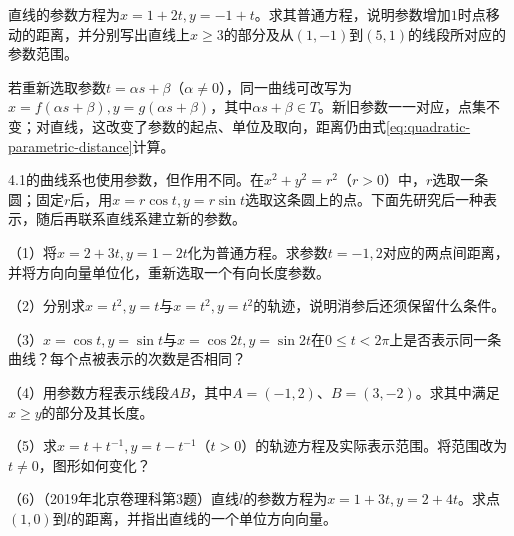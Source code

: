 \par\noindent\begin{minipage}{\linewidth}
\begin{example}
直线的参数方程为\(x=1+2t,y=-1+t\)。求其普通方程，说明参数增加\(1\)时点移动的距离，并分别写出直线上\(x\ge3\)的部分及从\((1,-1)\)到\((5,1)\)的线段所对应的参数范围。
\end{example}
\end{minipage}\par


若重新选取参数\(t=\alpha s+\beta\)（\(\alpha\ne0\)），同一曲线可改写为\(x=f(\alpha s+\beta),y=g(\alpha s+\beta)\)，其中\(\alpha s+\beta\in T\)。新旧参数一一对应，点集不变；对直线，这改变了参数的起点、单位及取向，距离仍由式\eqref{eq:quadratic-parametric-distance}计算。

4.1的曲线系也使用参数，但作用不同。在\(x^2+y^2=r^2\)（\(r>0\)）中，\(r\)选取一条圆；固定\(r\)后，用\(x=r\cos t,y=r\sin t\)选取这条圆上的点。下面先研究后一种表示，随后再联系直线系建立新的参数。

\begin{exercise}
\mbox{}\par\nobreak

\begin{samepage}
（1）将\(x=2+3t,y=1-2t\)化为普通方程。求参数\(t=-1,2\)对应的两点间距离，并将方向向量单位化，重新选取一个有向长度参数。
\par
\end{samepage}

\begin{samepage}
（2）分别求\(x=t^2,y=t\)与\(x=t^2,y=t^2\)的轨迹，说明消参后还须保留什么条件。
\par
\end{samepage}

\begin{samepage}
（3）\(x=\cos t,y=\sin t\)与\(x=\cos2t,y=\sin2t\)在\(0\le t<2\pi\)上是否表示同一条曲线？每个点被表示的次数是否相同？
\par
\end{samepage}

\begin{samepage}
（4）用参数方程表示线段\(AB\)，其中\(A=(-1,2)\)、\(B=(3,-2)\)。求其中满足\(x\ge y\)的部分及其长度。
\par
\end{samepage}

\begin{samepage}
（5）求\(x=t+t^{-1},y=t-t^{-1}\)（\(t>0\)）的轨迹方程及实际表示范围。将范围改为\(t\ne0\)，图形如何变化？
\par
\end{samepage}

\begin{samepage}
（6）（2019年北京卷理科第3题）直线\(l\)的参数方程为\(x=1+3t,y=2+4t\)。求点\((1,0)\)到\(l\)的距离，并指出直线的一个单位方向向量。
\par
\end{samepage}

\end{exercise}

